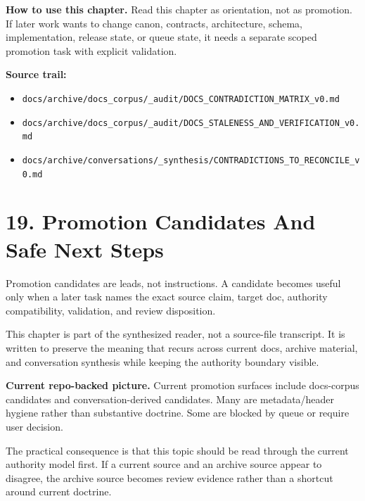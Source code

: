 \documentclass[10.5pt,a4paper,openany]{book}
\begin{document}
\textbf{How to use this chapter.} Read this chapter as orientation, not as promotion.\allowbreak{} If later work wants to change canon, contracts, architecture, schema, implementation, release state, or queue state, it needs a separate scoped promotion task with explicit validation.\allowbreak{}


\textbf{Source trail:}


\begin{itemize}
\item \texttt{docs/\allowbreak{}archive/\allowbreak{}docs\_\allowbreak{}corpus/\allowbreak{}\_\allowbreak{}audit/\allowbreak{}DOCS\_\allowbreak{}CONTRADICTION\_\allowbreak{}MATRIX\_\allowbreak{}v0.\allowbreak{}md}
\item \texttt{docs/\allowbreak{}archive/\allowbreak{}docs\_\allowbreak{}corpus/\allowbreak{}\_\allowbreak{}audit/\allowbreak{}DOCS\_\allowbreak{}STALENESS\_\allowbreak{}AND\_\allowbreak{}VERIFICATION\_\allowbreak{}v0.\allowbreak{}md}
\item \texttt{docs/\allowbreak{}archive/\allowbreak{}conversations/\allowbreak{}\_\allowbreak{}synthesis/\allowbreak{}CONTRADICTIONS\_\allowbreak{}TO\_\allowbreak{}RECONCILE\_\allowbreak{}v0.\allowbreak{}md}
\end{itemize}


\section{19. Promotion Candidates And Safe Next Steps}

Promotion candidates are leads, not instructions.\allowbreak{} A candidate becomes useful only when a later task names the exact source claim, target doc, authority compatibility, validation, and review disposition.\allowbreak{}


This chapter is part of the synthesized reader, not a source-\allowbreak{}file transcript.\allowbreak{} It is written to preserve the meaning that recurs across current docs, archive material, and conversation synthesis while keeping the authority boundary visible.\allowbreak{}


\textbf{Current repo-backed picture.} Current promotion surfaces include docs-\allowbreak{}corpus candidates and conversation-\allowbreak{}derived candidates.\allowbreak{} Many are metadata/\allowbreak{}header hygiene rather than substantive doctrine.\allowbreak{} Some are blocked by queue or require user decision.\allowbreak{}


The practical consequence is that this topic should be read through the current authority model first.\allowbreak{} If a current source and an archive source appear to disagree, the archive source becomes review evidence rather than a shortcut around current doctrine.\allowbreak{}
\end{document}
